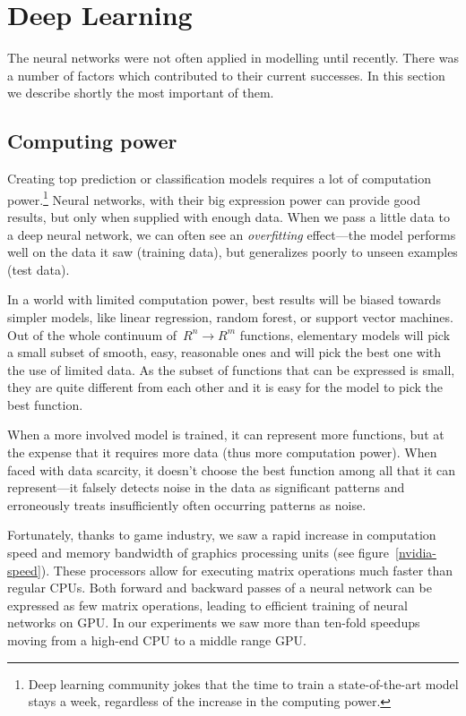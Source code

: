 \section{Deep Learning}
The neural networks were not often applied in modelling until recently. There was a number of factors which contributed to their current successes. In this section we describe shortly the most important of them.

\subsection{Computing power}
Creating top prediction or classification models requires a lot of computation power.\footnote{Deep learning community jokes that the time to train a state-of-the-art model stays a week, regardless of the increase in the computing power.} Neural networks, with their big expression power can provide good results, but only when supplied with enough data. When we pass a little data to a deep neural network, we can often see an \emph{overfitting} effect---the model performs well on the data it saw (training data), but generalizes poorly to unseen examples (test data).

In a world with limited computation power, best results will be biased towards simpler models, like linear regression, random forest, or support vector machines. Out of the whole continuum of~$R^n \rightarrow R^m$ functions, elementary models will pick a small subset of smooth, easy, reasonable ones and will pick the best one with the use of limited data. As the subset of functions that can be expressed is small, they are quite different from each other and it is easy for the model to pick the best function.

When a more involved model is trained, it can represent more functions, but at the expense that it requires more data (thus more computation power). When faced with data scarcity, it doesn't choose the best function among all that it can represent---it falsely detects noise in the data as significant patterns and erroneously treats insufficiently often occurring patterns as noise.

Fortunately, thanks to game industry, we saw a rapid increase in computation speed and memory bandwidth of graphics processing units (see figure~\ref{nvidia-speed}). These processors allow for executing matrix operations much faster than regular CPUs. Both forward and backward passes of a neural network can be expressed as few matrix operations, leading to efficient training of neural networks on GPU. In our experiments we saw more than ten-fold speedups moving from a high-end CPU to a middle range GPU.


